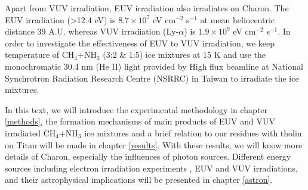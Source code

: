 Apart from VUV irradiation, EUV irradiation also irradiates on Charon. The EUV irradiation (>12.4 eV) is $8.7 \times 10^7$ eV cm$^{-2}$ s$^{-1}$ at mean heliocentric distance 39 A.U. whereas VUV irradiation (Ly-$\alpha$) is $1.9 \times 10^9$ eV cm$^{-2}$ s$^{-1}$\cite{grundy2016formation}. In order to investigate the effectiveness of EUV to VUV irradiation, we keep temperature of CH$_4$+NH$_3$ (3:2 \& 1:5) ice mixtures at 15 K and use the monochromatic 30.4 nm (He II) light provided by High flux beamline at National Synchrotron Radiation Research Centre (NSRRC) in Taiwan to irradiate the ice mixtures.

In this text, we will introduce the experimental methodology in chapter \ref{methods}, the formation mechanisms of main products of  EUV and VUV irradiated CH$_4$+NH$_3$ ice mixtures and a brief relation to our residues with tholin on Titan will be made in chapter \ref{results}. With these results, we will know more details of Charon, especially the influences of photon sources. Different energy sources including electron irradiation experiments , EUV and VUV irradiations, and their astrophysical implications will be presented in chapter \ref{astron}.
